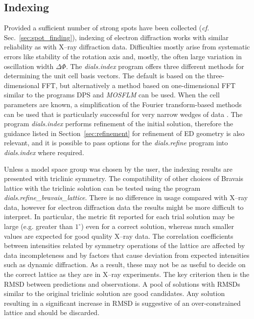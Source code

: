 \documentclass[preprint]{iucr}
\newcommand{\dialsindex}{\emph{dials.index}\xspace}
\newcommand{\dialsrefinebravaislattice}{\emph{dials.refine\_bravais\_lattice}\xspace}
\newcommand{\dialsrefine}{\emph{dials.refine}\xspace}
\newcommand{\mosflm}{\emph{MOSFLM}\xspace}
\begin{document}
\subsection{Indexing}

Provided a sufficient number of strong spots have been collected (\emph{cf.}
Sec.~\ref{sec:spot_finding}), indexing of electron diffraction works with
similar reliability as with X--ray diffraction data. Difficulties mostly arise
from systematic errors like stability of the rotation axis and, mostly, the
often large variation in oscillation width $\Delta \Phi$.  The \dialsindex
program offers three different methods for determining the unit cell basis
vectors. The default is based on the three-dimensional FFT, but alternatively a
method based on one-dimensional FFT similar to the programs DPS
\cite{Steller1997} and \mosflm \cite{leslie2007} can be used. When the cell
parameters are known, a simplification of the Fourier transform-based methods
can be used that is particularly successful for very narrow wedges of data
\cite{Gildea2014}. The program \dialsindex performs refinement of the initial
solution, therefore the guidance listed in Section~\ref{sec:refinement} for
refinement of ED geometry is also relevant, and it is possible to pass
options for the \dialsrefine program into \dialsindex where required.

Unless a model space group was chosen by the user, the indexing results are
presented with triclinic symmetry. The compatibility of other choices of
Bravais lattice with the triclinic solution can be tested using the program
\dialsrefinebravaislattice \cite{Winter2018,Sauter2006}. There is no difference
in usage compared with X--ray data, however for electron diffraction data the
results might be more difficult to interpret. In particular, the metric fit
reported for each trial solution \cite{LePage1982} may be large (e.g. greater
than $1^\circ$) even for a correct solution, whereas much smaller values are
expected for good quality X--ray data. The correlation coefficients between
intensities related by symmetry operations of the lattice are affected by data
incompleteness and by factors that cause deviation from expected intensities
such as dynamic diffraction. As a result, these may not be as useful to decide
on the correct lattice as they are in X--ray experiments. The key criterion then
is the RMSD between predictions and observations. A pool of solutions with
RMSDs similar to the original triclinic solution are good candidates. Any
solution resulting in a significant increase in RMSD is suggestive of an
over-constrained lattice and should be discarded.
\end{document}
